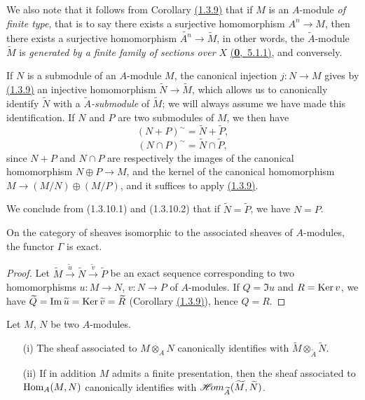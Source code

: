 We also note that it follows from Corollary \hyperref[cor-1.1.3.9]{(1.3.9)} that if $M$ is an $A$-module {\em of
finite type}, that is to say there exists a surjective homomorphism $A^n\to M$, then there
exists a surjective homomorphism $\widetilde{A^n}\to\widetilde{M}$, in other words, the
$\widetilde{A}$-module $\widetilde{M}$ is {\em generated by a finite family of sections over
$X$} \hyperref[env-0.5.1.1]{(\textbf{0},~5.1.1)}, and conversely.

\begin{env}[1.3.10]
\label{env-1.1.3.10}
If $N$ is a submodule of an $A$-module $M$, the canonical injection $j:N\to M$ gives by
\hyperref[cor-1.1.3.9]{(1.3.9)} an injective homomorphism $\widetilde{N}\to\widetilde{M}$, which allows us
to canonically identify $\widetilde{N}$ with a {\em $\widetilde{A}$-submodule} of
$\widetilde{M}$; we will always assume we have made this identification. If $N$ and $P$ are
two submodules of $M$, we then have
\[
  (N+P)^\sim=\widetilde{N}+\widetilde{P},
  \tag{1.3.10.1}
\]
\[
  (N\cap P)^\sim=\widetilde{N}\cap\widetilde{P},
  \tag{1.3.10.2}
\]
since $N+P$ and $N\cap P$ are respectively the images of the canonical homomorphism
$N\oplus P\to M$, and the kernel of the canonical homomorphism $M\to(M/N)\oplus(M/P)$, and
it suffices to apply \hyperref[cor-1.1.3.9]{(1.3.9)}.

We conclude from (1.3.10.1) and (1.3.10.2) that if $\widetilde{N}=\widetilde{P}$, we have
$N=P$.
\end{env}

\begin{cor}[1.3.11]
\label{cor-1.1.3.11}
On the category of sheaves isomorphic to the associated sheaves of $A$-modules, the functor
$\Gamma$ is exact.
\end{cor}

\begin{proof}
\label{proof-cor-1.1.3.11}
Let $\widetilde{M}\xrightarrow{\widetilde{u}}\widetilde{N}
\xrightarrow{\widetilde{v}}\widetilde{P}$ be an exact sequence corresponding to two
homomorphisms $u:M\to N$, $v:N\to P$ of $A$-modules. If $Q=\Im u$ and $R={\mathop{\mathrm{Ker}}\nolimits}\, v$, we have
$\widetilde{Q}={\mathop{\mathrm{Im}}\nolimits}\,\widetilde{u}={\mathop{\mathrm{Ker}}\nolimits}\,\widetilde{v}=\widetilde{R}$ (Corollary \hyperref[cor-1.1.3.9]{(1.3.9)}),
hence $Q=R$.
\end{proof}

\begin{cor}[1.3.12]
\label{cor-1.1.3.12}
Let $M$, $N$ be two $A$-modules.
\begin{itemize}
  \item[{\rm(i)}] The sheaf associated to $M\otimes_A N$ canonically identifies with
    $\widetilde{M}\otimes_{\widetilde{A}}\widetilde{N}$.
  \item[{\rm(ii)}] If in addition $M$ admits a finite presentation, then the sheaf associated to
    ${\mathop{\mathrm{Hom}}\nolimits}_A(M,N)$ canonically identifies with $\mathscr{H}\!{om}_{\widetilde{A}}(\widetilde{M},\widetilde{N})$.
\end{itemize}
\end{cor}

